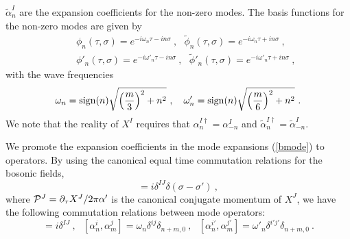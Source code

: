 \documentclass[a4paper,12pt]{article}
\numberwithin{equation}{section}
\begin{document}
$\tilde{\alpha}^I_n$ are the expansion coefficients for the non-zero
modes.  The basis functions for the non-zero modes are given by
\begin{eqnarray}
& & \phi_n (\tau, \sigma) = e^{-i \omega_n \tau - i n \sigma}~,~~~
\tilde{\phi}_n (\tau, \sigma) = e^{-i \omega_n \tau + i n \sigma}~,
\label{mode}  \\
& & \phi'_n (\tau, \sigma) = e^{-i \omega'_n \tau - i n \sigma}~,~~~
\tilde{\phi}'_n (\tau, \sigma)
  = e^{-i \omega'_n \tau + i n \sigma}~,
\label{pmode}
\end{eqnarray}
with the wave frequencies
\begin{equation}
\omega_n = {\rm sign}(n)
      \sqrt{ \left( \frac{m}{3} \right)^2 + n^2 }~,~~~
\omega'_n = {\rm sign}(n)
      \sqrt{ \left( \frac{m}{6} \right)^2 + n^2 }~.
\end{equation}
We note that the reality of $X^I$ requires that $\alpha^{I \dagger}_n
= \alpha^I_{-n}$ and $\tilde{\alpha}^{I \dagger}_n =
\tilde{\alpha}^I_{-n}$.

We promote the expansion coefficients in the mode expansions
(\ref{bmode}) to operators.  By using the canonical equal time
commutation relations for the bosonic fields,
\begin{equation}
[ X^I (\tau, \sigma), {\cal P}^J (\tau, \sigma') ]
= i \delta^{IJ} \delta (\sigma - \sigma') ~,
\label{bcom}
\end{equation}
where ${\cal P}^J = \partial_\tau X^J / 2 \pi \alpha'$ is the
canonical conjugate momentum of $X^J$, we have the following
commutation relations between mode operators:
\begin{equation}
[ x^I, p^J ] = i \delta^{IJ} ~,~~~
[ \alpha^i_n, \alpha^j_m ] = \omega_n \delta^{ij} \delta_{n+m,0}~,~~~
[ \alpha^{i'}_n, \alpha^{j'}_m ] =
   \omega'_n \delta^{i' j'} \delta_{n+m,0}~.
\label{bmcom}
\end{equation}
\end{document}
